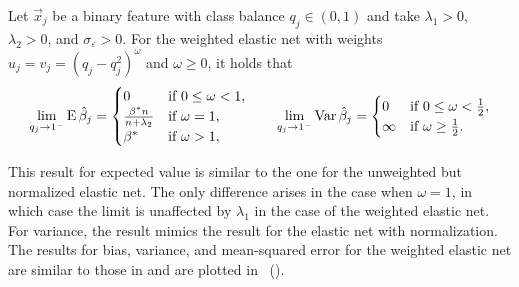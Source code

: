 \begin{theorem}
  \label{thm:weighted-elasticnet-bias-variance}
  Let \(\vec{x}_j\) be a binary feature with class balance \(q_j \in (0, 1)\) and take
  \(\lambda_1 > 0\), \(\lambda_2 > 0\), and \(\sigma_\varepsilon > 0\). For the
  weighted elastic net with weights \(u_j = v_j = (q_j-q_j^2)^\omega\) and \(\omega \geq 0\), it holds that
  \[
    \lim_{q_j \rightarrow 1^-} \operatorname{E} \hat{\beta}_j =
    \begin{cases}
      0                              & \text{if } 0 \leq \omega < 1, \\
      \frac{\beta^*n}{n + \lambda_2} & \text{if } \omega = 1,        \\
      \beta^*                        & \text{if } \omega > 1,
    \end{cases}
    \qquad
    \lim_{q_j \rightarrow 1^-} \operatorname{Var} \hat{\beta}_j =
    \begin{cases}
      0      & \text{if } 0 \leq \omega < \frac{1}{2}, \\
      \infty & \text{if } \omega \geq \frac{1}{2}.
    \end{cases}
  \]
\end{theorem}

This result for expected value is similar to the one for the unweighted but normalized
elastic net. The only difference arises in the case when \(\omega = 1\), in which case the
limit is unaffected by \(\lambda_1\) in the case of the weighted elastic net. For variance,
the result mimics the result for the elastic net with normalization. The results for bias,
variance, and mean-squared error for the weighted elastic net are similar to those in
 and are plotted in
~().
